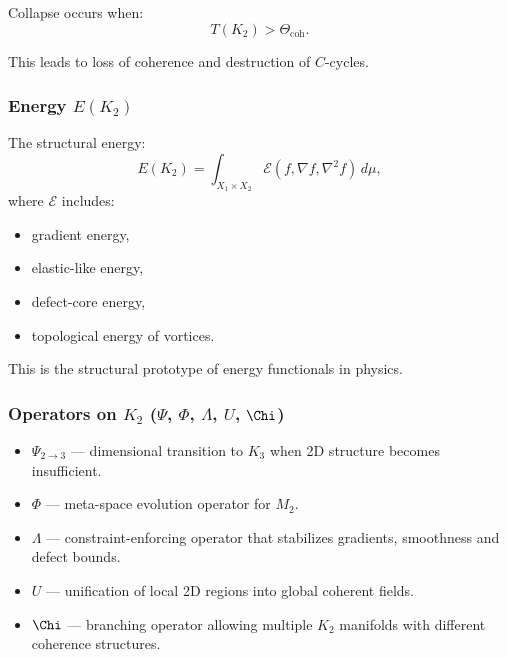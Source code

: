 Collapse occurs when:
\[
T(K_2) > \Theta_{\mathrm{coh}}.
\]

This leads to loss of coherence and destruction of $C$-cycles.

\subsubsection{Energy \texorpdfstring{$E(K_2)$}{E(K_2)}}

The structural energy:
\[
E(K_2) = \int_{X_1 \times X_2}
\mathcal{E}(f, \nabla f, \nabla^2 f)\, d\mu,
\]
where $\mathcal{E}$ includes:
\begin{itemize}
    \item gradient energy,
    \item elastic-like energy,
    \item defect-core energy,
    \item topological energy of vortices.
\end{itemize}

This is the structural prototype of energy functionals in physics.

\subsubsection{Operators on \texorpdfstring{$K_2$}{K_2} (\texorpdfstring{$\Psi$}{\Psi}, \texorpdfstring{$\Phi$}{\Phi}, \texorpdfstring{$\Lambda$}{\Lambda}, \texorpdfstring{$U$}{U}, \texorpdfstring{$\Chi$}{\Chi})}

\begin{itemize}
    \item $\Psi_{2\to3}$ — dimensional transition to $K_3$ when 2D
          structure becomes insufficient.
    \item $\Phi$ — meta-space evolution operator for $M_2$.
    \item $\Lambda$ — constraint-enforcing operator that stabilizes
          gradients, smoothness and defect bounds.
    \item $U$ — unification of local 2D regions into global coherent
          fields.
    \item $\Chi$ — branching operator allowing multiple $K_2$
          manifolds with different coherence structures.
\end{itemize}

